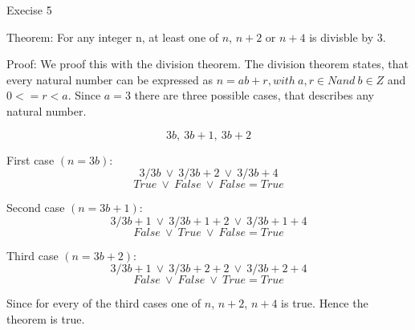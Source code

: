 \documentclass[12pt]{article}
\begin{document}
Execise 5

Theorem: For any integer n, at least one of $n$, $n+2$ or $n+4$ is divisble by 3.

Proof: We proof this with the division theorem. The division theorem states, that every natural number can be expressed as $n = ab + r, with\: a, r \in N and\: b \in Z$ and $0<=r<a$. Since $a = 3$ there are three possible cases, that describes any natural number.

\[3b,\: 3b + 1, \: 3b + 2\]

First case $(n = 3b)$:
\[3/3b\:\lor\:3/3b+2\:\lor\:3/3b+4\]
\[True\:\lor\:False\:\lor\:False = True\]

Second case $(n = 3b+1)$:
\[3/3b+1\:\lor\:3/3b+1+2\:\lor\:3/3b+1+4\]
\[False\:\lor\:True\:\lor\:False = True\]

Third case $(n = 3b+2)$:
\[3/3b+1\:\lor\:3/3b+2+2\:\lor\:3/3b+2+4\]
\[False\:\lor\:False\:\lor\:True = True\]

Since for every of the third cases one of $n$, $n+2$, $n+4$ is true. Hence the theorem is true.
\end{document}
